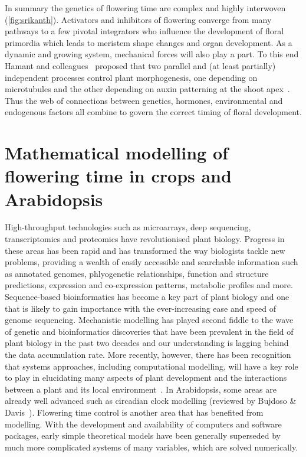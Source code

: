 In summary the genetics of flowering time are complex and highly interwoven (\autoref{fig:srikanth}).
Activators and inhibitors of flowering converge from many pathways to a few pivotal integrators who influence the development of floral primordia which leads to meristem shape changes and organ development.
As a dynamic and growing system, mechanical forces will also play a part.
To this end Hamant and colleagues~\cite{hamant2008} proposed that two parallel and (at least partially) independent processes control plant morphogenesis, one depending on microtubules and the other depending on auxin patterning at the shoot apex~\cite{smith2006,pierre2006,jonsson2006}.
Thus the web of connections between genetics, hormones, environmental and endogenous factors all combine to govern the correct timing of floral development.

\section{Mathematical modelling of flowering time in crops and Arabidopsis}
\label{sec:ftModels}
High-throughput technologies such as microarrays, deep sequencing, transcriptomics and proteomics have revolutionised plant biology.
Progress in these areas has been rapid and has transformed the way biologists tackle new problems, providing a wealth of easily accessible and searchable information such as annotated genomes, phlyogenetic relationships, function and structure predictions, expression and co-expression patterns, metabolic profiles and more.
Sequence-based bioinformatics has become a key part of plant biology and one that is likely to gain importance with the ever-increasing ease and speed of genome sequencing.
Mechanistic modelling has played second fiddle to the wave of genetic and bioinformatics discoveries that have been prevalent in the field of plant biology in the past two decades and our understanding is lagging behind the data accumulation rate.
More recently, however, there has been recognition that systems approaches, including computational modelling, will have a key role to play in elucidating many aspects of plant development and the interactions between a plant and its local environment~\cite{hammer2004,yin2010}.
In Arabidopsis, some areas are already well advanced such as circadian clock modelling (reviewed by Bujdoso \& Davis~\cite{bujdoso2013}).
Flowering time control is another area that has benefited from modelling.
With the development and availability of computers and software packages, early simple theoretical models have been generally superseded by much more complicated systems of many variables, which are solved numerically.

